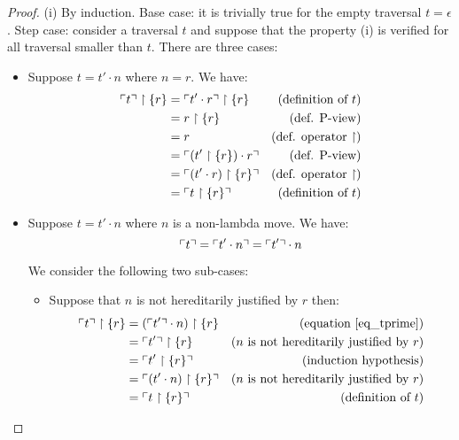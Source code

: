 \begin{proof}
(i) By induction. Base case: it is trivially true for the empty
traversal $t = \epsilon$. Step case: consider a traversal $t$ and
suppose that the property (i) is verified for all traversal smaller
than $t$. There are three cases:
\begin{itemize}
\item Suppose $t = t' \cdot n$ where $n = r$. We have:
    \begin{align*}
    \ulcorner t \urcorner \upharpoonright \{ r \}
        &=  \ulcorner t' \cdot r  \urcorner \upharpoonright \{ r \}      & (\mbox{definition of } t)\\
        &=  r \upharpoonright \{ r \}                        & (\mbox{def. P-view})\\
        &=  r                                                & (\mbox{def. operator $\upharpoonright$})\\
        &=  \ulcorner (t' \upharpoonright \{ r \}) \cdot r  \urcorner    & (\mbox{def. P-view})\\
        &=  \ulcorner (t' \cdot r)  \upharpoonright \{ r \} \urcorner    & (\mbox{def. operator $\upharpoonright$})\\
        &= \ulcorner t \upharpoonright \{ r \} \urcorner                & (\mbox{definition of } t)
    \end{align*}

\item Suppose $t = t' \cdot n$ where $n$ is a non-lambda
move. We have:
    \begin{equation}
    \ulcorner t \urcorner = \ulcorner t' \cdot n \urcorner = \ulcorner t' \urcorner \cdot n  \label{eq_tprime}
    \end{equation}

    We consider the following two sub-cases:
    \begin{itemize}
    \item Suppose that $n$ is not hereditarily justified by $r$ then:
    \begin{align*}
    \ulcorner t \urcorner \upharpoonright \{ r \}
        &= (\ulcorner t' \urcorner \cdot n) \upharpoonright \{ r \} & (\mbox{equation \ref{eq_tprime}}) \\
        &= \ulcorner t' \urcorner \upharpoonright \{ r \}           & (n \mbox{ is not hereditarily justified by } r) \\
        &= \ulcorner t' \upharpoonright \{ r \} \urcorner           & (\mbox{induction hypothesis}) \\
        &= \ulcorner (t' \cdot n) \upharpoonright \{ r \} \urcorner & (n \mbox{ is not hereditarily justified by } r) \\
        &= \ulcorner t \upharpoonright \{ r \}  \urcorner           & (\mbox{definition of } t)
    \end{align*}


\end{itemize}
\end{itemize}
\end{proof}
